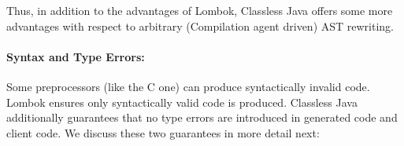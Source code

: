 Thus, in addition to the advantages of Lombok, Classless Java offers
some more advantages with respect to arbitrary (Compilation agent driven) AST rewriting.






\paragraph{Syntax and Type Errors:}
Some preprocessors (like the C one) can produce syntactically invalid code.
Lombok ensures only syntactically valid code is produced. %
Classless Java additionally guarantees that no type errors are introduced
in generated code and client code. We discuss these two guarantees in
more detail next:

